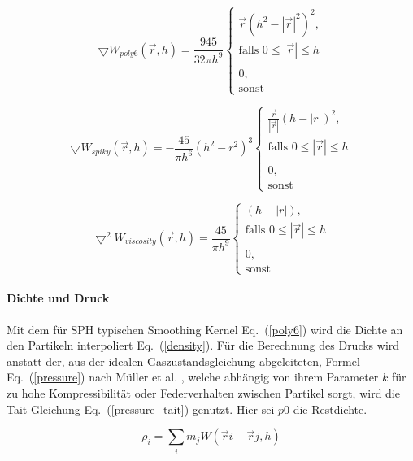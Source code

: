 \documentclass[a4paper]{paper}
\renewcommand{\eqref}[1]{Eq.~(\ref{#1})}
\begin{document}
\begin{equation}
\label{gradient_poly6}
\bigtriangledown W_{poly6}(\vec{r},h) = \frac{945}{32 \pi h^9} 
\begin{cases}
\vec{r}(h^2-|\vec{r}|^2)^2, \\ \text{falls } 0 \leq |\vec{r}| \leq h  \\
\\
0, \\ \text{sonst}
\end{cases}
\end{equation}

\begin{equation}
\label{spiky}
\bigtriangledown W_{spiky}(\vec{r},h) = -\frac{45}{\pi h^6} (h^2-r^2)^3
\begin{cases}
\frac{\vec{r}}{|\vec{r}|}(h-|r|)^2, \\ \text{falls } 0 \leq |\vec{r}| \leq h\\

\\ 0, \\ \text{sonst}
\end{cases}
\end{equation}

\begin{equation}
\label{viscosity}
\bigtriangledown^2 W_{viscosity}(\vec{r},h) = \frac{45}{\pi h^9} 
\begin{cases}
(h-|r|),

\\ \text{falls } 0 \leq |\vec{r}| \leq h \\
\\
0, 
\\ \text{sonst}
\end{cases}
\end{equation}


\paragraph{Dichte und Druck}
Mit dem für SPH typischen Smoothing Kernel \eqref{poly6} wird die Dichte an den Partikeln interpoliert \eqref{density}.
Für die Berechnung des Drucks wird anstatt der, aus der idealen Gaszustandsgleichung abgeleiteten, Formel \eqref{pressure} nach Müller et al. \citep{muller2003particle}, welche abhängig von ihrem Parameter $k$ für zu hohe Kompressibilität oder Federverhalten zwischen Partikel sorgt, wird die Tait-Gleichung \eqref{pressure_tait} genutzt. Hier sei $p0$ die Restdichte.

\begin{equation}
\label{density}
\rho_i = \sum_i{m_j W(\vec{r}{i}-\vec{r}{j},h)}
\end{equation}
\end{document}
